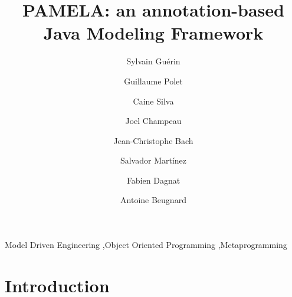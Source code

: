 \documentclass[preprint]{elsarticle}
\begin{document}
\begin{frontmatter}

\title{PAMELA: an annotation-based Java Modeling Framework}



\author[mymainaddress]{Sylvain Guérin}

\author[mymainaddress]{Guillaume Polet}

\author[mymainaddress]{Caine Silva}

\author[mymainaddress]{Joel Champeau}

\author[mysecondaryaddress]{Jean-Christophe Bach}

\author[mysecondaryaddress]{Salvador Mart\'inez}

\author[mysecondaryaddress]{Fabien Dagnat}

\author[mysecondaryaddress]{Antoine Beugnard}

\address[mymainaddress]{ENSTA Bretagne, Lab-STICC, UMR 6285, Brest, France}%
\address[mysecondaryaddress]{IMT Atlantique, Lab-STICC, UMR 6285, Brest, France}





\begin{keyword}
Model Driven Engineering \sep Object Oriented Programming \sep Metaprogramming 
\end{keyword}

\end{frontmatter}


\section{Introduction}
\label{sec:introduction}

\end{document}
